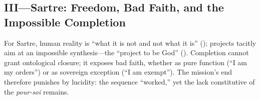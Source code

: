 \subsection*{III—Sartre: Freedom, Bad Faith, and the Impossible Completion}
\label{ssec:iii-sartre}
For Sartre, human reality is “what it is not and not what it is” (\parencite[pp.~100--110]{SartreBN2003}); projects tacitly aim at an impossible synthesis—the “project to be God” (\parencite[pp.~586--604]{SartreBN2003}). Completion cannot grant ontological closure; it exposes bad faith, whether as pure function (“I am my orders”) or as sovereign exception (“I am exempt”). The mission’s end therefore punishes by lucidity: the sequence “worked,” yet the lack constitutive of the \emph{pour-soi} remains.
